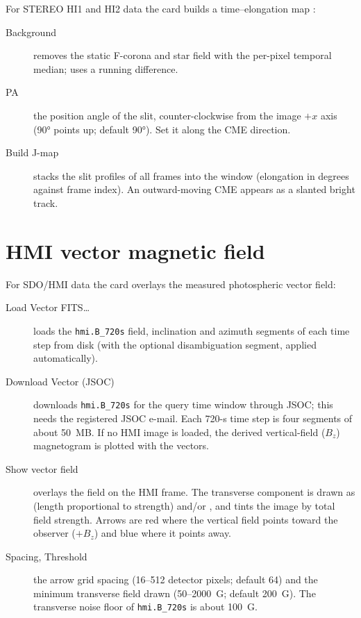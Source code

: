 For STEREO HI1 and HI2 data the  card builds a
time--elongation map \parencite{sheeley1999}:
\begin{description}
  \item[Background]  removes the static F-corona and star field with
    the per-pixel temporal median;  uses a running difference.
  \item[PA] the position angle of the slit, counter-clockwise from the image \(+x\) axis
    (90° points up; default 90°). Set it along the CME direction.
  \item[Build J-map] stacks the slit profiles of all frames into the  window
    (elongation in degrees against frame index). An outward-moving CME appears as a slanted
    bright track.
\end{description}

\section{HMI vector magnetic field}
\label{sec:hmi-vector}

For SDO/HMI data the  card overlays the measured
photospheric vector field:
\begin{description}
  \item[Load Vector FITS…] loads the \texttt{hmi.B\_720s} field, inclination and azimuth
    segments of each time step from disk (with the optional disambiguation segment, applied
    automatically).
  \item[Download Vector (JSOC)] downloads \texttt{hmi.B\_720s} for the query time window
    through JSOC; this needs the registered JSOC e-mail. Each 720-s time step is four segments
    of about 50~MB. If no HMI image is loaded, the derived vertical-field (\(B_z\))
    magnetogram is plotted with the vectors.
  \item[Show vector field] overlays the field on the HMI frame. The transverse component is
    drawn as  (length proportional to strength) and/or , and
     tints the image by total field strength. Arrows are red where the vertical
    field points toward the observer (\(+B_z\)) and blue where it points away.
  \item[Spacing, Threshold] the arrow grid spacing (16--512 detector pixels; default 64) and
    the minimum transverse field drawn (50--2000~G; default 200~G). The transverse noise floor
    of \texttt{hmi.B\_720s} is about 100~G.
\end{description}

